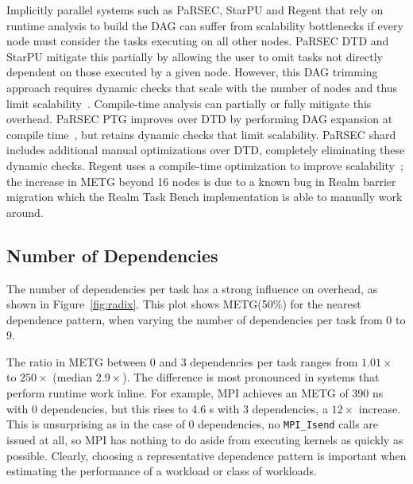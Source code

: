 

Implicitly parallel systems such as PaRSEC, StarPU and Regent that
rely on runtime analysis to build the DAG can suffer from
scalability bottlenecks if every node must consider the tasks
executing on all other nodes. PaRSEC DTD and StarPU mitigate this
partially by allowing the user to omit tasks not directly
dependent on those executed by a given node. However, this DAG
trimming approach requires dynamic checks that scale with
the number of nodes and thus limit scalability~\cite{PARSEC_DTD}. Compile-time analysis can
partially or fully mitigate this overhead. PaRSEC PTG improves over DTD 
by performing DAG expansion at compile time~\cite{PARSEC_DTD}, but
retains dynamic checks that limit scalability. PaRSEC shard includes additional manual optimizations over DTD, completely eliminating these dynamic checks. Regent
uses a compile-time optimization to improve
scalability~\cite{ControlReplication17}; the increase in METG beyond 16 nodes is due to a known bug in Realm barrier migration which the Realm Task Bench implementation is able to manually work around.

\subsection{Number of Dependencies}
\label{subsec:number-of-dependencies}

The number of dependencies per task has a strong influence on
overhead, as shown in
Figure~\ref{fig:radix}. This plot shows METG(50\%) for the nearest
dependence pattern, when varying the number of dependencies per task
from 0 to 9.



The ratio in METG between 0 and 3 dependencies per task ranges from
$1.01\times$ to $250\times$ (median $2.9\times$). The difference is most pronounced in systems that
perform runtime work inline. For example, MPI achieves an METG of 390
ns with 0 dependencies, but this rises to 4.6 \textmu{}s with 3 dependencies,
a $12\times$ increase. This is unsurprising as in the case
of 0 dependencies, no \lstinline[language=C++]{MPI_Isend} calls are
issued at all, so MPI has nothing to do aside from executing kernels
as quickly as possible. Clearly, choosing a representative dependence
pattern is important when estimating the performance of a workload or
class of workloads.

